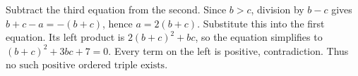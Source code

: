 Subtract the third equation from the second. Since $b>c$, division by $b-c$ gives $b+c-a=-(b+c)$, hence $a=2(b+c)$. Substitute this into the first equation. Its left product is $2(b+c)^2+bc$, so the equation simplifies to $(b+c)^2+3bc+7=0$. Every term on the left is positive, contradiction. Thus $\boxed{\text{no such positive ordered triple exists}}$.
